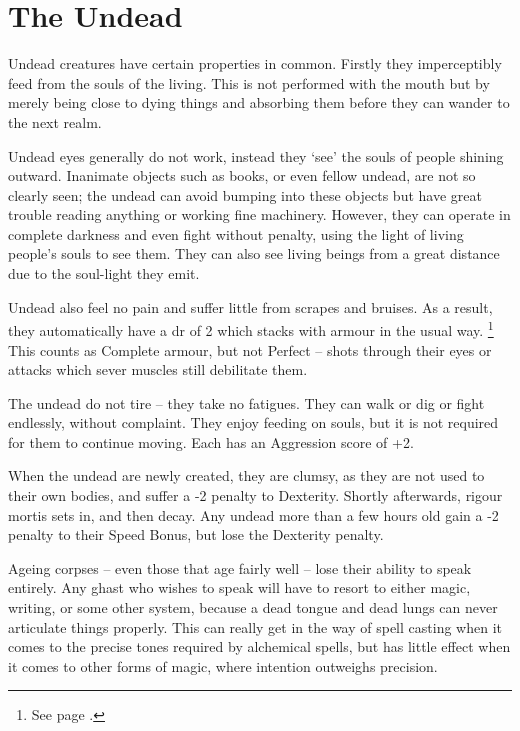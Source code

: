 \section{The Undead}

\begin{multicols}{2}

\noindent
Undead creatures have certain properties in common.
Firstly they imperceptibly feed from the souls of the living.
This is not performed with the mouth but by merely being close to dying things and absorbing them before they can wander to the next realm.

Undead eyes generally do not work, instead they `see' the souls of people shining outward.
Inanimate objects such as books, or even fellow undead, are not so clearly seen; the undead can avoid bumping into these objects but have great trouble reading anything or working fine machinery.
However, they can operate in complete darkness and even fight without penalty, using the light of living people's souls to see them.
They can also see living beings from a great distance due to the soul-light they emit.

Undead also feel no pain and suffer little from scrapes and bruises.
As a result, they automatically have a \gls{dr} of 2 which stacks with armour in the usual way.%
\footnote{See page \pageref{stackingarmour}.}
This counts as Complete armour, but not Perfect -- shots through their eyes or attacks which sever muscles still debilitate them.

The undead do not tire -- they take no \glspl{fatigue}.
They can walk or dig or fight endlessly, without complaint.
They enjoy feeding on souls, but it is not required for them to continue moving.
Each has an Aggression score of +2.

When the undead are newly created, they are clumsy, as they are not used to their own bodies, and suffer a -2 penalty to Dexterity.
Shortly afterwards, rigour mortis sets in, and then decay.
Any undead more than a few hours old gain a -2 penalty to their Speed Bonus, but lose the Dexterity penalty.

Ageing corpses -- even those that age fairly well -- lose their ability to speak entirely.
Any ghast who wishes to speak will have to resort to either magic, writing, or some other system, because a dead tongue and dead lungs can never articulate things properly.
This can really get in the way of spell casting when it comes to the precise tones required by alchemical spells, but has little effect when it comes to other forms of magic, where intention outweighs precision.


\end{multicols}
